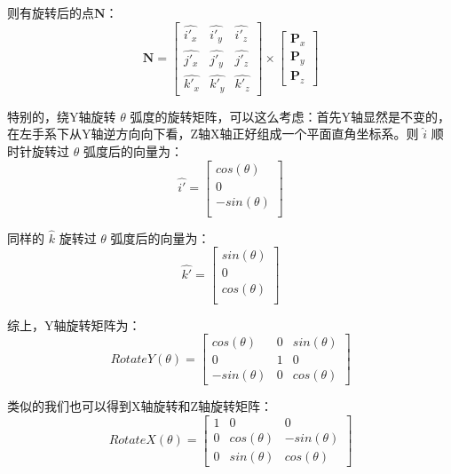\documentclass[12pt,oneside,a4paper]{ctexart}
\begin{document}
则有旋转后的点$\mathbf{N}$：
\begin{equation*}
	\mathbf{N} = \begin{bmatrix}
		\hat{i'_x} & \hat{i'_y} & \hat{i'_z} \\
		\hat{j'_x} & \hat{j'_y} & \hat{j'_z} \\
		\hat{k'_x} & \hat{k'_y} & \hat{k'_z}
	\end{bmatrix} \times \begin{bmatrix}
		\mathbf{P}_x \\
		\mathbf{P}_y \\
		\mathbf{P}_z
	\end{bmatrix}
\end{equation*}

特别的，绕Y轴旋转 $\theta$ 弧度的旋转矩阵，可以这么考虑：首先Y轴显然是不变的，在左手系下从Y轴逆方向向下看，Z轴X轴正好组成一个平面直角坐标系。则 $\hat{i}$ 顺时针旋转过 $\theta$ 弧度后的向量为：
\begin{equation*}
	\hat{i'}=\begin{bmatrix}
		cos(\theta)  \\
		0            \\
		-sin(\theta) \\
	\end{bmatrix}
\end{equation*}

同样的 $\hat{k}$ 旋转过 $\theta$ 弧度后的向量为：
\begin{equation*}
	\hat{k'}=\begin{bmatrix}
		sin(\theta) \\
		0           \\
		cos(\theta) \\
	\end{bmatrix}
\end{equation*}

综上，Y轴旋转矩阵为：
\begin{equation}
	RotateY(\theta)=\begin{bmatrix}
		cos(\theta)  & 0 & sin(\theta) \\
		0            & 1 & 0           \\
		-sin(\theta) & 0 & cos(\theta)
	\end{bmatrix}
	\label{RotateY}
\end{equation}

类似的我们也可以得到X轴旋转和Z轴旋转矩阵：
\begin{equation}
	RotateX(\theta)=\begin{bmatrix}
		1 & 0           & 0            \\
		0 & cos(\theta) & -sin(\theta) \\
		0 & sin(\theta) & cos(\theta)
	\end{bmatrix}
	\label{RotateX}
\end{equation}
\end{document}
